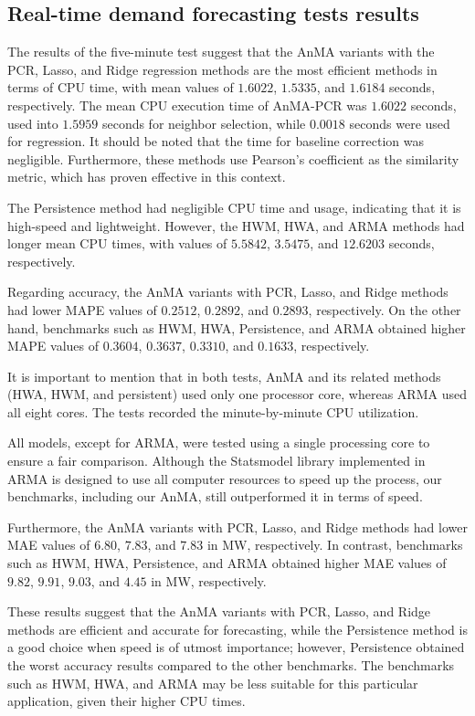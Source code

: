 \subsection{Real-time demand forecasting tests results}
The results of the five-minute test suggest that the AnMA variants with the PCR, Lasso, and Ridge regression methods are the most efficient methods in terms of CPU time, with mean values of $1.6022$, $1.5335$, and $1.6184$ seconds, respectively. The mean CPU execution time of AnMA-PCR was $1.6022$ seconds, used into $1.5959$ seconds for neighbor selection, while $0.0018$ seconds were used for regression. It should be noted that the time for baseline correction was negligible. 
 Furthermore, these methods use Pearson's coefficient as the similarity metric, which has proven effective in this context.

The Persistence method had negligible CPU time and usage, indicating that it is high-speed and lightweight. However, the HWM, HWA, and ARMA methods had longer mean CPU times, with values of $5.5842$, $3.5475$, and $12.6203$ seconds, respectively.

Regarding accuracy, the AnMA variants with PCR, Lasso, and Ridge methods had lower MAPE values of $0.2512$, $0.2892$, and $0.2893$, respectively. On the other hand, benchmarks such as HWM, HWA, Persistence, and ARMA obtained higher MAPE values of $0.3604$, $0.3637$, $0.3310$, and $0.1633$, respectively.

It is important to mention that in both tests, AnMA and its related methods (HWA, HWM, and persistent) used only one processor core, whereas ARMA used all eight cores. The tests recorded the minute-by-minute CPU utilization. 

All models, except for ARMA, were tested using a single processing core to ensure a fair comparison. Although the Statsmodel \citep{seabold2010statsmodels} library implemented in ARMA is designed to use all computer resources to speed up the process, our benchmarks, including our AnMA, still outperformed it in terms of speed. 

Furthermore, the AnMA variants with PCR, Lasso, and Ridge methods had lower MAE values of $6.80$, $7.83$, and $7.83$ in MW, respectively. In contrast, benchmarks such as HWM, HWA, Persistence, and ARMA obtained higher MAE values of $9.82$, $9.91$, $9.03$, and $4.45$ in MW, respectively.

These results suggest that the AnMA variants with PCR, Lasso, and Ridge methods are efficient and accurate for forecasting, while the Persistence method is a good choice when speed is of utmost importance; however, Persistence obtained the worst accuracy results compared to the other benchmarks. The benchmarks such as HWM, HWA, and ARMA may be less suitable for this particular application, given their higher CPU times.

